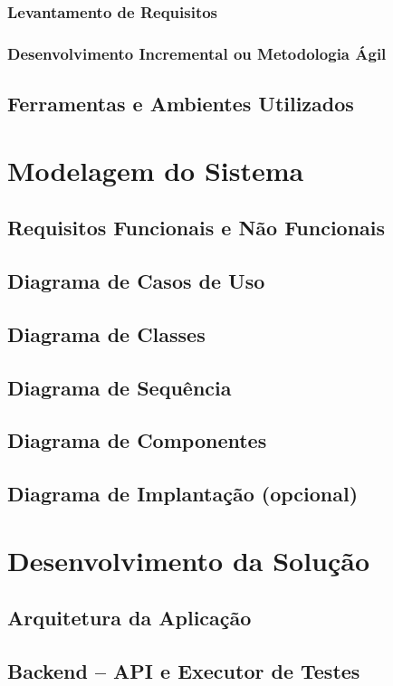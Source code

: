 \documentclass[a4paper,12pt]{article}
\begin{document}
\subsubsection{Levantamento de Requisitos}
\subsubsection{Desenvolvimento Incremental ou Metodologia Ágil}
\subsection{Ferramentas e Ambientes Utilizados}

\section{Modelagem do Sistema}
\subsection{Requisitos Funcionais e Não Funcionais}
\subsection{Diagrama de Casos de Uso}
\subsection{Diagrama de Classes}
\subsection{Diagrama de Sequência}
\subsection{Diagrama de Componentes}
\subsection{Diagrama de Implantação (opcional)}

\section{Desenvolvimento da Solução}
\subsection{Arquitetura da Aplicação}
\subsection{Backend – API e Executor de Testes}
\end{document}
